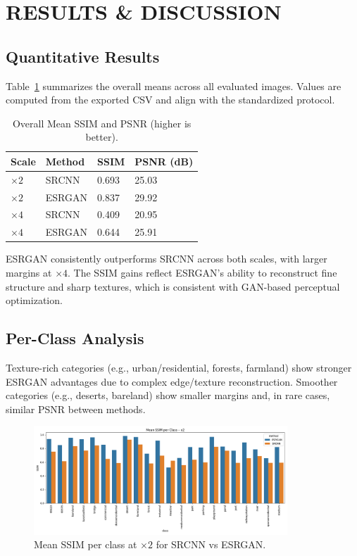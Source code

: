\documentclass[]{spie}
\begin{document}
\section{RESULTS \& DISCUSSION}
\subsection{Quantitative Results}
Table~\ref{tab:overall_performance} summarizes the overall means across all evaluated images. Values are computed from the exported CSV and align with the standardized protocol.

\begin{table}[h!]
\centering
\caption{Overall Mean SSIM and PSNR (higher is better).}
\label{tab:overall_performance}
\begin{tabular}{llll}
\toprule
\textbf{Scale} & \textbf{Method} & \textbf{SSIM} & \textbf{PSNR (dB)} \\
\midrule
$\times2$ & SRCNN  & 0.693 & 25.03 \\
$\times2$ & ESRGAN & 0.837 & 29.92 \\
$\times4$ & SRCNN  & 0.409 & 20.95 \\
$\times4$ & ESRGAN & 0.644 & 25.91 \\
\bottomrule
\end{tabular}
\end{table}

ESRGAN consistently outperforms SRCNN across both scales, with larger margins at $\times4$. The SSIM gains reflect ESRGAN's ability to reconstruct fine structure and sharp textures, which is consistent with GAN-based perceptual optimization.

\subsection{Per-Class Analysis}
Texture-rich categories (e.g., urban/residential, forests, farmland) show stronger ESRGAN advantages due to complex edge/texture reconstruction. Smoother categories (e.g., deserts, bareland) show smaller margins and, in rare cases, similar PSNR between methods.

\begin{figure}[h!]
\centering
\includegraphics[width=0.85\textwidth]{ssim_per_class_x2.png}
\caption{Mean SSIM per class at $\times2$ for SRCNN vs ESRGAN.}
\label{fig:ssim_x2}
\end{figure}
\end{document}
